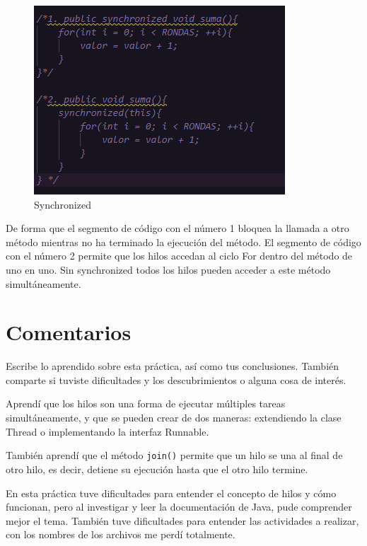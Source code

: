 \documentclass{article}
\begin{document}
\begin{enumerate}
    \begin{figure}
        \centering
        \includegraphics[width=\textwidth]{sincronized.png}
        \caption{Synchronized}
    \end{figure}
    De forma que el segmento de código con el número 1 bloquea la llamada a otro método mientras no ha terminado la ejecución del método. El segmento de código con el número 2 permite que los hilos accedan al ciclo For dentro del método de uno en uno. Sin synchronized todos los hilos pueden acceder a este método simultáneamente.
    
\end{enumerate}

\section{Comentarios}
Escribe lo aprendido sobre esta práctica, así como tus conclusiones. También comparte si tuviste dificultades y los descubrimientos o alguna cosa de interés.

Aprendí que los hilos son una forma de ejecutar múltiples tareas simultáneamente, y que se pueden crear de dos maneras: extendiendo la clase Thread o implementando la interfaz Runnable.

También aprendí que el método \texttt{join()} permite que un hilo se una al final de otro hilo, es decir, detiene su ejecución hasta que el otro hilo termine.

En esta práctica tuve dificultades para entender el concepto de hilos y cómo funcionan, pero al investigar y leer la documentación de Java, pude comprender mejor el tema. También tuve dificultades para entender las actividades a realizar, con los nombres de los archivos me perdí totalmente.
\end{document}
